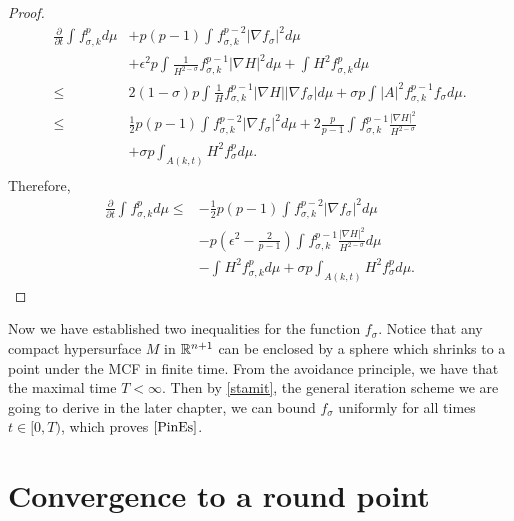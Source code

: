 \begin{proof}
\begin{equation}
\begin{split}
            \frac{\partial }{\partial t}\int_{}^{}f_{\sigma,k }^{p} d \mu 
            &+ p(p-1)\int_{}^{}f_{\sigma,k }^{p-2} \left| \nabla f_\sigma  \right| ^2 d \mu \\
            &+ \epsilon ^2 p \int_{}^{}\frac{1}{H^{2-\sigma }}f_{\sigma,k }^{p-1} \left| \nabla H \right| ^2 d \mu + \int_{}^{}H^2 f_{\sigma,k }^{p} d \mu  \\ 
        \leq & 2(1-\sigma)p \int_{}^{} \frac{1}{H}f_{\sigma,k }^{p-1} \left| \nabla H \right| \left| \nabla f_{\sigma }^{}  \right| d \mu + \sigma p \int_{}^{} \left| A \right| ^2 f_{\sigma,k }^{p-1} f_{\sigma }^{} d \mu .  \\
        \leq & \frac{1}{2} p(p-1) \int_{}^{} f_{\sigma ,k}^{p-2} \left| \nabla f_{\sigma }^{}  \right| ^2 d \mu + 2 \frac{p}{p-1} \int_{}^{} f_{\sigma ,k}^{p-1} \frac{\left| \nabla H \right| ^2}{H^{2-\sigma }} \\
        &+ \sigma p \int_{A(k,t)}^{} H ^2  f_{\sigma }^{p} d \mu .  \\
        \end{split}
        \end{equation}
    Therefore,
    \begin{equation}
    \begin{split}
        \frac{\partial }{\partial t}\int_{}^{}f_{\sigma,k }^{p} d \mu 
    \leq&  -\frac{1}{2} p(p-1) \int_{}^{} f_{\sigma ,k}^{p-2} \left| \nabla f_{\sigma }^{}  \right| ^2 d \mu\\
    & -p\left( \epsilon ^2-\frac{2}{p-1} \right)\int_{}^{} f_{\sigma ,k}^{p-1} \frac{\left| \nabla H \right| ^2}{H^{2-\sigma }} d \mu  \\
    & - \int_{}^{}H^2 f_{\sigma,k }^{p} d \mu +\sigma p \int_{A(k,t)}^{} H ^2  f_{\sigma }^{p} d \mu .
    \end{split}
    \end{equation} 
\end{proof}

Now we have established two inequalities for the function $f_{\sigma }^{} $. Notice that any compact hypersurface $M$ in $\mathbb{R}^{n+1}$ can be enclosed by a sphere which shrinks to a point under the MCF in finite time. From the avoidance principle, we have that the maximal time $T< \infty $. Then by \autoref{stamit}, the general iteration scheme we are going to derive in the later chapter, we can bound $f_{\sigma }^{} $ uniformly for all times $t \in [0,T)$, which proves $\autoref{PinEs}$. 

\section{Convergence to a round point}

